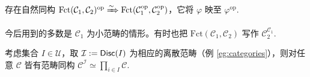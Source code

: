 \begin{proposition}\label{prop:op-functor-cat}
	存在自然同构 $\mathrm{Fct}(\mathcal{C}_1, \mathcal{C}_2)^\mathrm{op} \xRightarrow{\sim} \mathrm{Fct}(\mathcal{C}_1^{\mathrm{op}}, \mathcal{C}_2^{\mathrm{op}})$，它将 $\varphi$ 映至 $\varphi^\mathrm{op}$.
\end{proposition}

今后用到的多数是 $\mathcal{C}_1$ 为小范畴的情形。有时也把 $\mathrm{Fct}(\mathcal{C}_1, \mathcal{C}_2)$ 写作 $\mathcal{C}_2^{\mathcal{C}_1}$.
\begin{example}
	考虑集合 $I \in \mathcal{U}$，取 $\mathcal{I} := \mathsf{Disc}(I)$ 为相应的离散范畴（例 \ref{eg:categories}），则对任意 $\mathcal{C}$ 皆有范畴同构 $\mathcal{C}^{\mathcal{I}} \simeq \prod_{i \in I} \mathcal{C}$.
\end{example}



